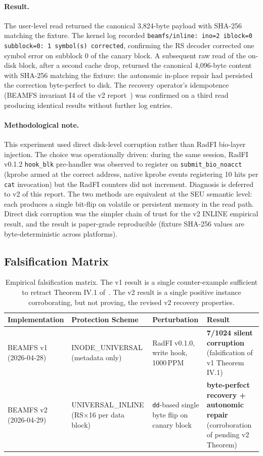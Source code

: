 \paragraph{Result.}
The user-level read returned the canonical 3{,}824-byte payload with
SHA-256 matching the fixture. The kernel log recorded
\texttt{beamfs/inline: ino=2 iblock=0 subblock=0: 1 symbol(s) corrected},
confirming the RS decoder corrected one symbol error on subblock 0
of the canary block. A subsequent raw read of the on-disk block,
after a second cache drop, returned the canonical 4{,}096-byte
content with SHA-256 matching the fixture: the autonomic in-place
repair had persisted the correction byte-perfect to disk. The
recovery operator's idempotence (BEAMFS invariant I4 of the v2 report~\cite{desbrieres2026beamfsv2}) was confirmed on a third read
producing identical results without further log entries.

\paragraph{Methodological note.}
This experiment used direct disk-level corruption rather than RadFI
bio-layer injection. The choice was operationally driven: during
the same session, RadFI v0.1.2 \texttt{hook\_blk} pre-handler was
observed to register on \texttt{submit\_bio\_noacct} (kprobe armed
at the correct address, native kprobe events registering 10 hits
per \texttt{cat} invocation) but the RadFI counters did not
increment. Diagnosis is deferred to v2 of this report. The two
methods are equivalent at the SEU semantic level: each produces a
single bit-flip on volatile or persistent memory in the read path.
Direct disk corruption was the simpler chain of trust for the v2
INLINE empirical result, and the result is paper-grade reproducible
(fixture SHA-256 values are byte-deterministic across platforms).

\subsection{Falsification Matrix}

\begin{table}[t]
\caption{Empirical falsification matrix. The v1 result is a single
counter-example sufficient to retract Theorem IV.1
of~\cite{desbrieres2026beamfsv1}. The v2 result is a single positive
instance corroborating, but not proving, the revised v2 recovery
properties.}
\label{tab:falsification-matrix}
\centering
\small
\begin{tabular}{@{}p{3cm}p{4.2cm}p{3.8cm}p{5.3cm}@{}}
\toprule
Implementation & Protection Scheme & Perturbation & Result \\
\midrule
BEAMFS v1 (2026-04-28) & INODE\_UNIVERSAL (metadata only) & RadFI v0.1.0, write hook, 1000\,PPM & \textbf{7/1024 silent corruption} (falsification of v1 Theorem IV.1) \\
BEAMFS v2 (2026-04-29) & UNIVERSAL\_INLINE (RS\(\times\)16 per data block) & \texttt{dd}-based single byte flip on canary block & \textbf{byte-perfect recovery + autonomic repair} (corroboration of pending v2 Theorem) \\
\bottomrule
\end{tabular}
\end{table}
